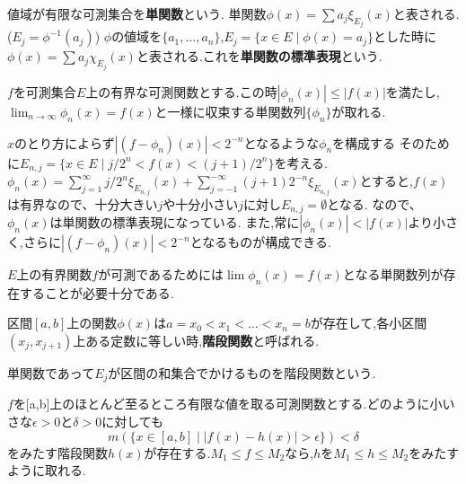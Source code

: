 \begin{screen}
\begin{dfn}
 値域が有限な可測集合を\textbf{単関数}という.
 単関数$\phi(x) = \sum a_j \xi_{E_j}(x)$と表される.($E_j = \phi^{-1}(a_j)$)
 $\phi$の値域を$\{a_1, \ldots, a_n\}$,$E_j = \{x \in E \mid \phi(x)=a_j\}$とした時に
 $\phi(x)= \sum a_j \chi_{E_j}(x)$と表される.これを\textbf{単関数の標準表現}という.
\end{dfn}
\end{screen}

\begin{thm}
 $f$を可測集合$E$上の有界な可測関数とする.この時$|\phi_n(x)| \le |f(x)|$を満たし,$\displaystyle \lim_{n \to \infty} \phi_n(x) =  f(x)$と一様に収束する単関数列$\{\phi_n\}$が取れる.
\end{thm}
$x$のとり方によらず$|(f - \phi_n)(x)| < 2^{-n}$となるような$\phi_n$を構成する
そのために$E_{n,j}= \{x \in E \mid j/2^n < f(x) < (j+1)/ 2^n\}$を考える.
$\phi_n(x) = \sum_{j=1}^{\infty} j/2^n \xi_{E_{n,j}}(x) + \sum_{j=-1}^{-\infty}(j+1)2^{-n}\xi_{E_{n,j}}(x)$とすると,$f(x)$は有界なので、十分大きい$j$や十分小さい$j$に対し$E_{n, j} = \emptyset$となる.
なので、$\phi_n(x)$は単関数の標準表現になっている.
また,常に$|\phi_n(x)| < |f(x)|$より小さく,さらに$|(f - \phi_n)(x)| < 2^{-n}$となるものが構成できる.

\begin{cor}
 $E$上の有界関数$f$が可測であるためには$\lim \phi_n(x) = f(x)$となる単関数列が存在することが必要十分である.
\end{cor}

\begin{screen}
\begin{dfn}
 区間$[a, b]$上の関数$\phi(x)$は$a=x_0 < x_1 < \ldots < x_n = b$が存在して,各小区間$(x_j, x_{j+1})$上ある定数に等しい時,\textbf{階段関数}と呼ばれる.
\end{dfn}
\end{screen}
\begin{rem}
 単関数であって$E_j$が区間の和集合でかけるものを階段関数という.
\end{rem}
\begin{thm}
 $f$を[a,b]上のほとんど至るところ有限な値を取る可測関数とする.どのように小いさな$\epsilon > 0$と$\delta > 0$に対しても
 \begin{equation*}
  m(\{x \in [a, b] \mid |f(x) - h(x)| > \epsilon\}) < \delta
 \end{equation*}
をみたす階段関数$h(x)$が存在する.$M_1 \le f \le M_2$なら,$h$を$M_1 \le h \le M_2$をみたすように取れる.
\end{thm}


